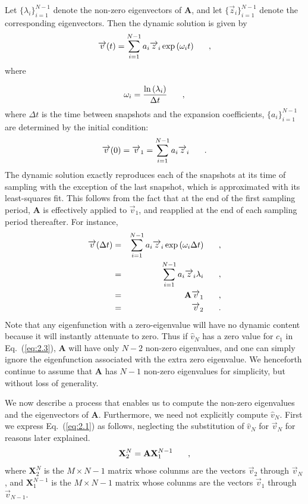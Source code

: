 \documentclass{style/nseJournal}
\renewcommand{\vec}[1]{\overrightarrow{#1}}
\newcommand{\bea}{\begin{eqnarray}}
\newcommand{\eea}{\end{eqnarray}}
\newcommand{\be}{\begin{equation}}
\newcommand{\ee}{\end{equation}}
\newcommand{\pec}{\hspace{0.25in},}
\newcommand{\pep}{\hspace{0.25in}.}
\newcommand{\LEQ}[1]{\label{eq:#1}}
\newcommand{\EQ}[1]{Eq.~(\ref{eq:#1})}
\newcommand{\mA}{\mathbf{A}}
\newcommand{\mX}{\mathbf{X}}
\begin{document}
Let $\{\lambda_i\}_{i=1}^{N-1}$ denote the non-zero eigenvectors of $\mA$, and let $\{\vec{z}_i\}_{i=1}^{N-1}$ denote the corresponding eigenvectors.  
Then the dynamic solution is given by 
\be
	\vec{v}(t) = \sum_{i=1}^{N-1} a_i \vec{z}_i \exp{(\omega_i t)} \pec
\LEQ{2.5a}
\ee
where

\be
	\omega_i = \frac{\ln{(\lambda_i)}}{\Delta t} \pec
	\LEQ{2.5b}
\ee
where $\Delta t$ is the time between snapshots and the expansion coefficients, 
$\{a_i\}_{i=1}^{N-1}$ are determined by the initial condition:
\be
	\vec{v}(0) = \vec{v}_1 = \sum_{i=1}^{N-1} a_i \vec{z}_i \pep
	\LEQ{2.5c}
\ee
The dynamic solution exactly reproduces each of the snapshots at its time of 
sampling with the exception of the last snapshot, which is approximated with 
its least-squares fit.  
This follows from the fact that at the end of the first sampling period, $\mA$ 
is effectively applied to $\vec{v}_1$, and reapplied at the end of each 
sampling period thereafter.  
For instance, 
\bea
	\vec{v}(\Delta t) &=& \sum_{i=1}^{N-1} a_i \vec{z}_i \exp{(\omega_i \Delta t)} \pec \nonumber \\
	&=& \sum_{i=1}^{N-1} a_i \vec{z}_i \lambda_i \pec \nonumber \\ 
	&=& \mA \vec{v}_1 \pec \nonumber \\ 
	&=& \vec{v}_2 \pep
	\LEQ{2.5d}
\eea 
Note that any eigenfunction with a zero-eigenvalue will have no dynamic content because it will instantly attenuate to zero.  
Thus if $\widehat{v}_N$ has a zero value for $c_1$ in \EQ{2.3}, $\mA$ will have only $N-2$ non-zero eigenvalues, and one can simply ignore the eigenfunction associated with the extra zero eigenvalue.  
We henceforth continue to assume that $\mA$ has $N-1$ non-zero eigenvalues for simplicity, but without loss of generality.  

We now describe a process that enables us to compute the non-zero eigenvalues and the eigenvectors of $\mA$.  
Furthermore, we need not explicitly compute $\widehat{v}_N$.  
First we express \EQ{2.1} as follows, neglecting the substitution of $\widehat{v}_N$ for $\vec{v}_N$ for reasons later explained.  
\be
	\mX_2^{N} = \mA \mX_{1}^{N-1} \pec
\LEQ{2.6}
\ee
where $\mX_2^{N}$ is the $M \times N-1$ matrix whose colunms are the vectors $\vec{v}_2$ through $\vec{v}_{N}$, and $\mX_{1}^{N-1}$ is the $M\times N-1$ matrix whose colunms are the vectors $\vec{v}_1$ through $\vec{v}_{N-1}$.  
\end{document}
